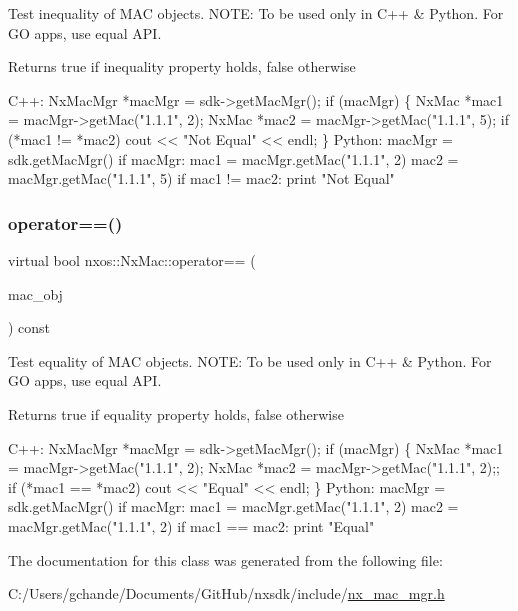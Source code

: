 Test inequality of M\+AC objects. N\+O\+TE\+: To be used only in C++ \& Python. For GO apps, use equal A\+PI.

\begin{DoxyReturn}{Returns}
true if inequality property holds, false otherwise
\end{DoxyReturn}

\begin{DoxyCode}
C++:
    NxMacMgr *macMgr = sdk->getMacMgr();
    \textcolor{keywordflow}{if} (macMgr) \{
        NxMac *mac1 = macMgr->getMac(\textcolor{stringliteral}{"1.1.1"}, 2);
        NxMac *mac2 = macMgr->getMac(\textcolor{stringliteral}{"1.1.1"}, 5);
        \textcolor{keywordflow}{if} (*mac1 != *mac2)
            cout << \textcolor{stringliteral}{"Not Equal"} << endl;
    \}
Python:
    macMgr = sdk.getMacMgr()
    \textcolor{keywordflow}{if} macMgr:
       mac1 = macMgr.getMac(\textcolor{stringliteral}{"1.1.1"}, 2)
       mac2 = macMgr.getMac(\textcolor{stringliteral}{"1.1.1"}, 5)
       \textcolor{keywordflow}{if} mac1 != mac2:
          print \textcolor{stringliteral}{"Not Equal"}
\end{DoxyCode}
 \mbox{\label{classnxos_1_1_nx_mac_ae6ebe78a6679fb460e2ed1f18c08acd0}} 
\subsubsection{\texorpdfstring{operator==()}{operator==()}}
{\footnotesize\ttfamily virtual bool nxos\+::\+Nx\+Mac\+::operator== (\begin{DoxyParamCaption}\item[{\mbox{\hyperlink{classnxos_1_1_nx_mac}{Nx\+Mac}} const \&}]{mac\+\_\+obj }\end{DoxyParamCaption}) const\hspace{0.3cm}{\ttfamily [pure virtual]}}

Test equality of M\+AC objects. N\+O\+TE\+: To be used only in C++ \& Python. For GO apps, use equal A\+PI.

\begin{DoxyReturn}{Returns}
true if equality property holds, false otherwise
\end{DoxyReturn}

\begin{DoxyCode}
C++:
    NxMacMgr *macMgr = sdk->getMacMgr();
    \textcolor{keywordflow}{if} (macMgr) \{
        NxMac *mac1 = macMgr->getMac(\textcolor{stringliteral}{"1.1.1"}, 2);
        NxMac *mac2 = macMgr->getMac(\textcolor{stringliteral}{"1.1.1"}, 2);;
        \textcolor{keywordflow}{if} (*mac1 == *mac2)
            cout << \textcolor{stringliteral}{"Equal"} << endl;
    \}
Python:
    macMgr = sdk.getMacMgr()
    \textcolor{keywordflow}{if} macMgr:
       mac1 = macMgr.getMac(\textcolor{stringliteral}{"1.1.1"}, 2)
       mac2 = macMgr.getMac(\textcolor{stringliteral}{"1.1.1"}, 2)
       \textcolor{keywordflow}{if} mac1 == mac2:
          print \textcolor{stringliteral}{"Equal"}
\end{DoxyCode}
 

The documentation for this class was generated from the following file\+:\begin{DoxyCompactItemize}
\item 
C\+:/\+Users/gchande/\+Documents/\+Git\+Hub/nxsdk/include/\mbox{\hyperlink{nx__mac__mgr_8h}{nx\+\_\+mac\+\_\+mgr.\+h}}\end{DoxyCompactItemize}
